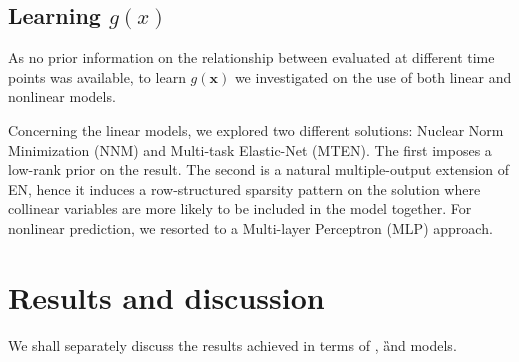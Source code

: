 
\subsection{Learning $g(x)$}

As no prior information on the relationship between \PCOs evaluated at different time points was available, to learn $g(\bm{x})$ we investigated on the use of both linear and nonlinear models.

Concerning the linear models, we explored two different solutions: Nuclear Norm Minimization (\ac{NNM}) and Multi-task Elastic-Net (\ac{MTEN}). The first imposes a low-rank prior on the result. The second is a natural multiple-output extension of EN, hence it induces a row-structured sparsity pattern on the solution where collinear variables are more likely to be included in the model together. For nonlinear prediction, we resorted to a Multi-layer Perceptron (\ac{MLP}) approach.

\section{Results and discussion}\label{sec:aism_results}

We shall separately discuss the results achieved in terms of \F, \G and \FOG models.

